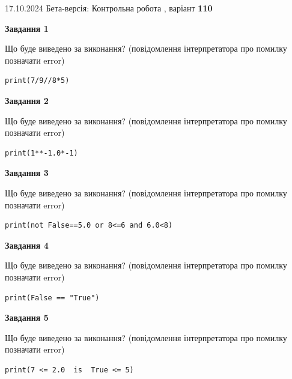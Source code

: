 \documentclass[12pt, ukrainian]{article}
\begin{document}
{\Large{17.10.2024 Бета-версія: Контрольна робота , варіант  \No \textbf { 110 }\par}}
{
\begin {large}
{\begin {center}\textbf{Завдання 1}\end {center}}

Що буде виведено за виконання? (повідомлення інтерпретатора про помилку позначати error)\par
\begin{verbatim}
print(7/9//8*5)
\end{verbatim}

{\begin {center}\textbf{Завдання 2}\end {center}}

Що буде виведено за виконання? (повідомлення інтерпретатора про помилку позначати error)\par
\begin{verbatim}
print(1**-1.0*-1)
\end{verbatim}

{\begin {center}\textbf{Завдання 3}\end {center}}

Що буде виведено за виконання? (повідомлення інтерпретатора про помилку позначати error)\par
\begin{verbatim}
print(not False==5.0 or 8<=6 and 6.0<8)
\end{verbatim}

{\begin {center}\textbf{Завдання 4}\end {center}}

Що буде виведено за виконання? (повідомлення інтерпретатора про помилку позначати error)\par
\begin{verbatim}
print(False == "True")
\end{verbatim}

{\begin {center}\textbf{Завдання 5}\end {center}}

Що буде виведено за виконання? (повідомлення інтерпретатора про помилку позначати error)\par
\begin{verbatim}
print(7 <= 2.0  is  True <= 5)
\end{verbatim}


\end{large}}
\end{document}
